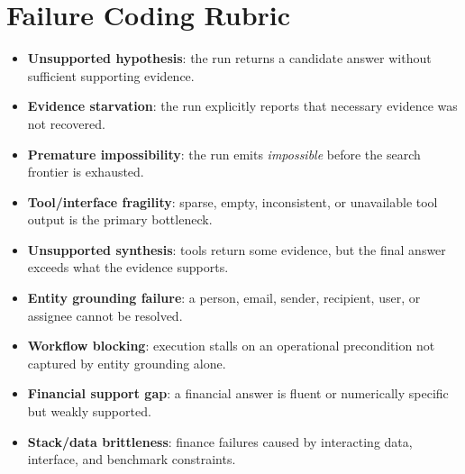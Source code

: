 \documentclass{article}
\theoremstyle{plain}
\theoremstyle{definition}
\theoremstyle{remark}
\begin{document}
\section{Failure Coding Rubric}
\begin{itemize}
    \item \textbf{Unsupported hypothesis}: the run returns a candidate answer without sufficient supporting evidence.
    \item \textbf{Evidence starvation}: the run explicitly reports that necessary evidence was not recovered.
    \item \textbf{Premature impossibility}: the run emits \emph{impossible} before the search frontier is exhausted.
    \item \textbf{Tool/interface fragility}: sparse, empty, inconsistent, or unavailable tool output is the primary bottleneck.
    \item \textbf{Unsupported synthesis}: tools return some evidence, but the final answer exceeds what the evidence supports.
    \item \textbf{Entity grounding failure}: a person, email, sender, recipient, user, or assignee cannot be resolved.
    \item \textbf{Workflow blocking}: execution stalls on an operational precondition not captured by entity grounding alone.
    \item \textbf{Financial support gap}: a financial answer is fluent or numerically specific but weakly supported.
    \item \textbf{Stack/data brittleness}: finance failures caused by interacting data, interface, and benchmark constraints.
\end{itemize}
\end{document}
